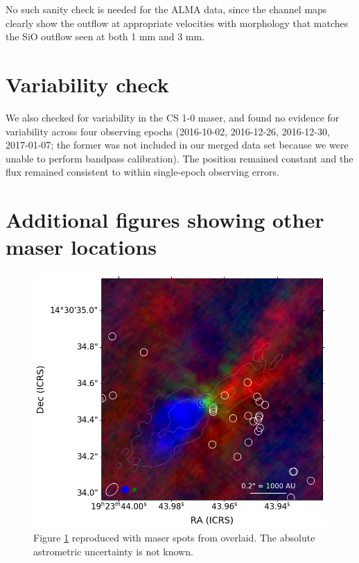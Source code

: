 \documentclass[twocolumn]{aastex62}
\begin{document}
No such sanity check is needed for the ALMA data, since the channel maps
clearly show the outflow at appropriate velocities with morphology that matches
the SiO outflow seen at both 1 mm and 3 mm.

\section{Variability check}
We also checked for variability in the CS 1-0 maser, and found no evidence for
variability across four observing epochs (2016-10-02, 2016-12-26, 2016-12-30,
2017-01-07; the former was not included in our merged data set because we were unable
to perform bandpass calibration).  The position remained constant and the flux
remained consistent to within single-epoch observing errors.

\section{Additional figures showing other maser locations}
\begin{figure}[htp]
    \includegraphics[width=\textwidth]{figures/W51e2e_sio_outflow_with_CS_contours_and_ch3oh.png}
    \caption{Figure \ref{fig:overlay} reproduced with \methanol maser spots from \citet{Etoka2012a}
    overlaid.  The absolute astrometric uncertainty is not known.
    }
    \label{fig:overlay}
\end{figure}
\end{document}

